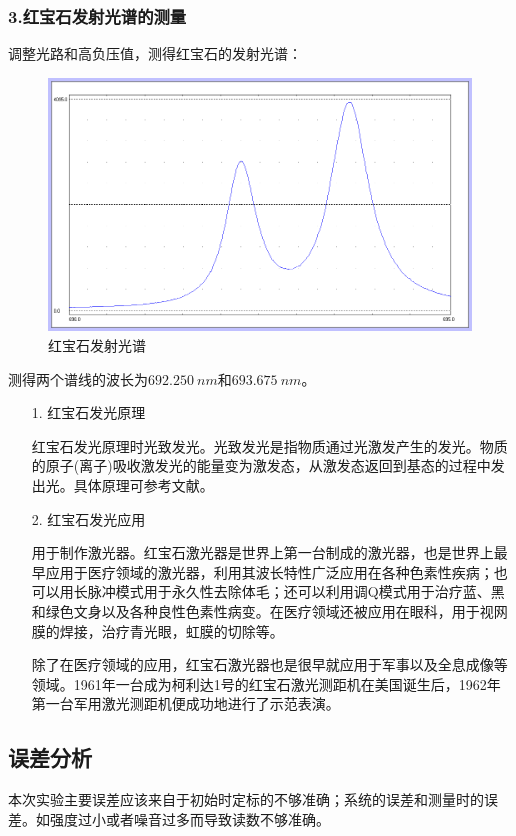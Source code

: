 \documentclass[utf8]{ctexart}
\begin{document}
	\subsubsection*{3.红宝石发射光谱的测量}
	调整光路和高负压值，测得红宝石的发射光谱：
	\begin{figure}[htbp]
		\centering
		\includegraphics[scale=0.6]{6red.png}
		\caption{红宝石发射光谱}
	\end{figure}

	测得两个谱线的波长为$\qty{692.250}{nm}$和$\qty{693.675}{nm}$。
	
	\begin{itemize}
		\item [1.]红宝石发光原理\cite{art1}
		\par
		红宝石发光原理时光致发光。光致发光是指物质通过光激发产生的发光。物质的原子(离子)吸收激发光的能量变为激发态，从激发态返回到基态的过程中发出光。具体原理可参考文献\cite{art1}。
		\item [2.]红宝石发光应用
		
		用于制作激光器。红宝石激光器是世界上第一台制成的激光器，也是世界上最早应用于医疗领域的激光器，利用其波长特性广泛应用在各种色素性疾病；也可以用长脉冲模式用于永久性去除体毛；还可以利用调Q模式用于治疗蓝、黑和绿色文身以及各种良性色素性病变。在医疗领域还被应用在眼科，用于视网膜的焊接，治疗青光眼，虹膜的切除等。
		
		除了在医疗领域的应用，红宝石激光器也是很早就应用于军事以及全息成像等领域。1961年一台成为柯利达1号的红宝石激光测距机在美国诞生后，1962年第一台军用激光测距机便成功地进行了示范表演。
		
		
	\end{itemize}
	
	
	\subsection*{误差分析}
	本次实验主要误差应该来自于初始时定标的不够准确；系统的误差和测量时的误差。如强度过小或者噪音过多而导致读数不够准确。
\end{document}
